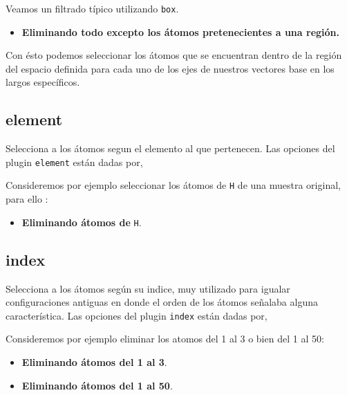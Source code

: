 Veamos un filtrado t\'ipico utilizando \verb|box|.

\begin{itemize}
 \item \textbf{Eliminando todo excepto los \'atomos pretenecientes a una regi\'on.}
\end{itemize}

Con \'esto podemos seleccionar los \'atomos que se encuentran dentro de la regi\'on del espacio definida para cada uno de los ejes de nuestros vectores base en los largos espec\'ificos.

\subsection{element}
Selecciona a los \'atomos segun el elemento al que pertenecen. Las opciones del plugin \verb|element| est\'an dadas por,


Consideremos por ejemplo seleccionar los \'atomos de \verb|H| de una muestra original, para ello :

\begin{itemize}
 \item \textbf{Eliminando \'atomos de} \texttt{H}.
\end{itemize}


\subsection{index}
Selecciona a los \'atomos seg\'un su indice, muy utilizado para igualar configuraciones antiguas en donde el orden de los \'atomos se\~nalaba alguna caracter\'istica. Las opciones del plugin \verb|index| est\'an dadas por,


Consideremos por ejemplo eliminar los atomos del 1 al 3 o bien del 1 al 50:

\begin{itemize}
 \item \textbf{Eliminando \'atomos del 1 al 3}.
 \item \textbf{Eliminando \'atomos del 1 al 50}.
\end{itemize}

